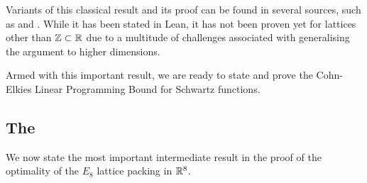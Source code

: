 Variants of this classical result and its proof can be found in several sources, such as \cite[Chapter VII, \S6, Proposition 15]{SerreArith} and \cite[Chapter VII, \S7, Equation (VII, 7:5)]{SchwartzDistrib}. While it has been stated in Lean, it has not been proven yet for lattices other than $\mathbb{Z} \subset \mathbb{R}$ due to a multitude of challenges associated with generalising the argument to higher dimensions.

Armed with this important result, we are ready to state and prove the Cohn-Elkies Linear Programming Bound for Schwartz functions.

\subsection{The \CELP}

We now state the most important intermediate result in the proof of the optimality of the $E_8$ lattice packing in $\mathbb{R}^8$.%

